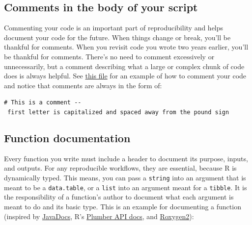 \documentclass[
]{book}
\begin{document}
\subsection{Comments in the body of your script}\label{comments-in-the-body-of-your-script}

Commenting your code is an important part of reproducibility and helps document your code for the future. When things change or break, you'll be thankful for comments. When you revisit code you wrote two years earlier, you'll be thankful for comments. There's no need to comment excessively or unnecessarily, but a comment describing what a large or complex chunk of code does is always helpful. See \href{https://github.com/kmishra9/Flu-Absenteeism/blob/master/Master's%20Thesis%20-%20Spatial%20Epidemiology%20of%20Influenza/1b%20-%20Map-Management.R}{this file} for an example of how to comment your code and notice that comments are always in the form of:

\texttt{\#\ This\ is\ a\ comment\ -\/-\ first\ letter\ is\ capitalized\ and\ spaced\ away\ from\ the\ pound\ sign}

\subsection{Function documentation}\label{function-documentation}

Every function you write must include a header to document its purpose, inputs, and outputs. For any reproducible workflows, they are essential, because R is dynamically typed. This means, you can pass a \texttt{string} into an argument that is meant to be a \texttt{data.table}, or a \texttt{list} into an argument meant for a \texttt{tibble}. It is the responsibility of a function's author to document what each argument is meant to do and its basic type. This is an example for documenting a function (inspired by \href{https://www.oracle.com/technetwork/java/javase/documentation/index-137868.html#format}{JavaDocs}, R's \href{https://blog.rstudio.com/2018/10/23/rstudio-1-2-preview-plumber-integration/}{Plumber API docs}, and \href{https://kbroman.org/pkg_primer/pages/docs.html}{Roxygen2}):
\end{document}
